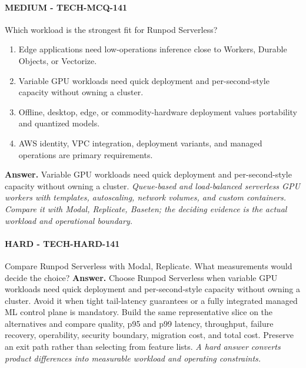 \paragraph{MEDIUM - TECH-MCQ-141} Which workload is the strongest fit for Runpod Serverless?
\begin{enumerate}[label=\Alph*.]
\item Edge applications need low-operations inference close to Workers, Durable Objects, or Vectorize.
\item Variable GPU workloads need quick deployment and per-second-style capacity without owning a cluster.
\item Offline, desktop, edge, or commodity-hardware deployment values portability and quantized models.
\item AWS identity, VPC integration, deployment variants, and managed operations are primary requirements.
\end{enumerate}
\textbf{Answer.} Variable GPU workloads need quick deployment and per-second-style capacity without owning a cluster.
\textit{Queue-based and load-balanced serverless GPU workers with templates, autoscaling, network volumes, and custom containers. Compare it with Modal, Replicate, Baseten; the deciding evidence is the actual workload and operational boundary.}
\paragraph{HARD - TECH-HARD-141} Compare Runpod Serverless with Modal, Replicate. What measurements would decide the choice?
\textbf{Answer.} Choose Runpod Serverless when variable GPU workloads need quick deployment and per-second-style capacity without owning a cluster. Avoid it when tight tail-latency guarantees or a fully integrated managed ML control plane is mandatory. Build the same representative slice on the alternatives and compare quality, p95 and p99 latency, throughput, failure recovery, operability, security boundary, migration cost, and total cost. Preserve an exit path rather than selecting from feature lists.
\textit{A hard answer converts product differences into measurable workload and operating constraints.}
